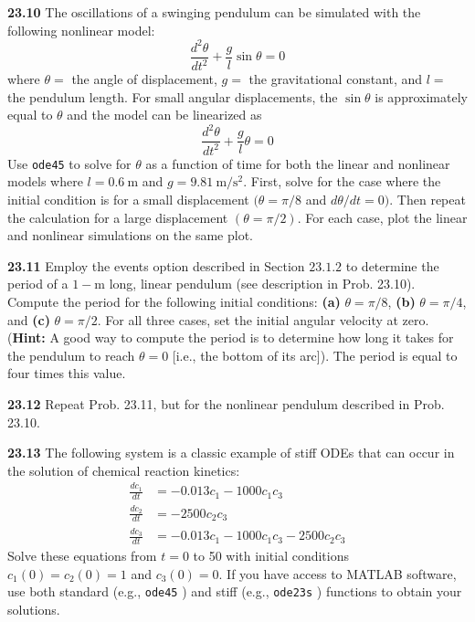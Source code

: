 \documentclass[../main.tex]{subfiles}
\begin{document}
\noindent\textbf{23.10} The oscillations of a swinging pendulum can be simulated with the following nonlinear model:
$$
\frac{d^{2} \theta}{d t^{2}}+\frac{g}{l} \sin \theta=0
$$
where $\theta=$ the angle of displacement, $g=$ the gravitational constant, and $l=$ the pendulum length. For small angular displacements, the $\sin \theta$ is approximately equal to $\theta$ and the model can be linearized as
$$
\frac{d^{2} \theta}{d t^{2}}+\frac{g}{l} \theta=0
$$
Use \texttt{ode45} to solve for $\theta$ as a function of time for both the linear and nonlinear models where $l=0.6 \mathrm{~m}$ and $g=9.81 \mathrm{~m} / \mathrm{s}^{2}$. First, solve for the case where the initial condition is for a small displacement $(\theta=\pi / 8$ and $d \theta / d t=0)$. Then repeat the calculation for a large displacement $(\theta=\pi / 2)$. For each case, plot the linear and nonlinear simulations on the same plot.\vspace{2mm}

\noindent\textbf{23.11} Employ the events option described in Section $23.1 .2$ to determine the period of a $1-\mathrm{m}$ long, linear pendulum (see description in Prob. 23.10). Compute the period for the following initial conditions: \textbf{(a)} $\theta=\pi / 8$, \textbf{(b)} $\theta=\pi / 4$, and \textbf{(c)} $\theta=\pi / 2$.
For all three cases, set the initial angular velocity at zero. (\textbf{Hint:} A good way to compute the period is to determine how long it takes for the pendulum to reach $\theta=0$ [i.e., the bottom of its arc]). The period is equal to four times this value.\vspace{2mm}

\noindent\textbf{23.12} Repeat Prob. 23.11, but for the nonlinear pendulum described in Prob. 23.10.\vspace{2mm}

\noindent\textbf{23.13} The following system is a classic example of stiff ODEs that can occur in the solution of chemical reaction kinetics:
$$
\begin{aligned}
\frac{d c_{1}}{d t} &=-0.013 c_{1}-1000 c_{1} c_{3} \\
\frac{d c_{2}}{d t} &=-2500 c_{2} c_{3} \\
\frac{d c_{3}}{d t} &=-0.013 c_{1}-1000 c_{1} c_{3}-2500 c_{2} c_{3}
\end{aligned}
$$
Solve these equations from $t=0$ to 50 with initial conditions $c_{1}(0)=c_{2}(0)=1$ and $c_{3}(0)=0$. If you have access to MATLAB software, use both standard (e.g., \texttt{ode45} ) and stiff (e.g., \texttt{ode23s} ) functions to obtain your solutions.\vspace{2mm}
\end{document}
